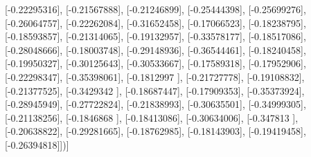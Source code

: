 \documentclass{article}
\begin{document}
       [-0.22295316],
       [-0.21567888],
       [-0.21246899],
       [-0.25444398],
       [-0.25699276],
       [-0.26064757],
       [-0.22262084],
       [-0.31652458],
       [-0.17066523],
       [-0.18238795],
       [-0.18593857],
       [-0.21314065],
       [-0.19132957],
       [-0.33578177],
       [-0.18517086],
       [-0.28048666],
       [-0.18003748],
       [-0.29148936],
       [-0.36544461],
       [-0.18240458],
       [-0.19950327],
       [-0.30125643],
       [-0.30533667],
       [-0.17589318],
       [-0.17952906],
       [-0.22298347],
       [-0.35398061],
       [-0.1812997 ],
       [-0.21727778],
       [-0.19108832],
       [-0.21377525],
       [-0.3429342 ],
       [-0.18687447],
       [-0.17909353],
       [-0.35373924],
       [-0.28945949],
       [-0.27722824],
       [-0.21838993],
       [-0.30635501],
       [-0.34999305],
       [-0.21138256],
       [-0.1846868 ],
       [-0.18413086],
       [-0.30634006],
       [-0.347813  ],
       [-0.20638822],
       [-0.29281665],
       [-0.18762985],
       [-0.18143903],
       [-0.19419458],
       [-0.26394818]])]
\end{document}
